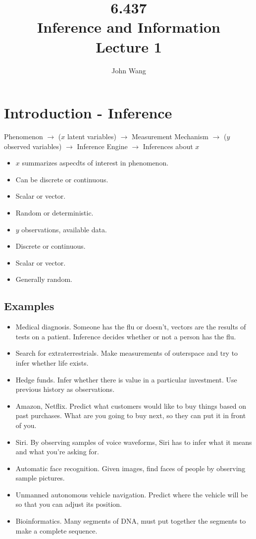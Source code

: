 \documentclass[psamsfonts]{amsart}
\title{6.437 \\
Inference and Information \\
Lecture 1}
\author{John Wang}
\begin{document}
\maketitle

\section{Introduction - Inference}

Phenomenon $\rightarrow$ ($x$ latent variables) $\rightarrow$ Measurement Mechanism $\rightarrow$ ($y$ observed variables) $\rightarrow$ Inference Engine $\rightarrow$ Inferences about $x$

\begin{itemize}
\item $x$ summarizes aspecdts of interest in phenomenon. 
\item Can be discrete or continuous. 
\item Scalar or vector. 
\item Random or deterministic.
\end{itemize}

\begin{itemize}
\item $y$ observations, available data.
\item Discrete or continuous.
\item Scalar or vector.
\item Generally random.
\end{itemize}

\subsection{Examples}

\begin{itemize}
\item Medical diagnosis. Someone has the flu or doesn't, vectors are the results of tests on a patient. Inference decides whether or not a person has the flu.
\item Search for extraterrestrials. Make measurements of outerspace and try to infer whether life exists.
\item Hedge funds. Infer whether there is value in a particular investment. Use previous history as observations.
\item Amazon, Netflix. Predict what customers would like to buy things based on past purchases. What are you going to buy next, so they can put it in front of you.
\item Siri. By observing samples of voice waveforms, Siri has to infer what it means and what you're asking for.
\item Automatic face recognition. Given images, find faces of people by observing sample pictures.
\item Unmanned autonomous vehicle navigation. Predict where the vehicle will be so that you can adjust its position.
\item Bioinformatics. Many segments of DNA, must put together the segments to make a complete sequence. 
\end{itemize}
\end{document}
